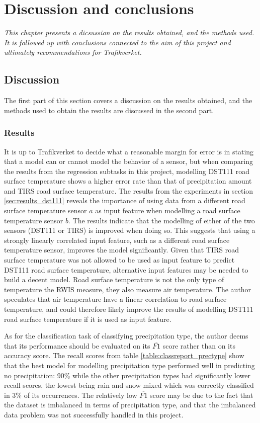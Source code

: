\chapter{Discussion and conclusions}
\emph{This chapter presents a dicsussion on the results obtained, and the methods used. It is followed up with conclusions connected to the aim of this project and ultimately recommendations for Trafikverket.}

\section{Discussion}
	The first part of this section covers a discussion on the results obtained, and the methods used to obtain the results are discussed in the second part.

	\subsection{Results}
	It is up to Trafikverket to decide what a reasonable margin for error is in stating that a model can or cannot model the behavior of a sensor, but when comparing the results from the regression subtasks in this project, modelling DST111 road surface temperature shows a higher error rate than that of precipitation amount and TIRS road surface temperature. The results from the experiments in section \ref{sec:results_dst111} reveals the importance of using data from a different road surface temperature sensor $a$ as input feature when modelling a road surface temperature sensor $b$. The results indicate that the modelling of either of the two sensors (DST111 or TIRS) is improved when doing so. This suggests that using a strongly linearly correlated input feature, such as a different road surface temperature sensor, improves the model significantly. Given that TIRS road surface temperature was not allowed to be used as input feature to predict DST111 road surface temperature, alternative input features may be needed to build a decent model. Road surface temperature is not the only type of temperature the RWIS measure, they also measure air temperature. The author speculates that air temperature have a linear correlation to road surface temperature, and could therefore likely improve the results of modelling DST111 road surface temperature if it is used as input feature. 

	As for the classification task of classifying precipitation type, the author deems that its performance should be evaluated on its $\overline{F1}$ score rather than on its accuracy score. The recall scores from table \ref{table:classreport_prectype} show that the best model for modelling precipitation type performed well in predicting no precipitation: 90\% while the other precipitation types had significantly lower recall scores, the lowest being rain and snow mixed which was correctly classified in 3\% of its occurrences. The relatively low $\overline{F1}$ score may be due to the fact that the dataset is imbalanced in terms of precipitation type, and that the imbalanced data problem was not successfully handled in this project. 


